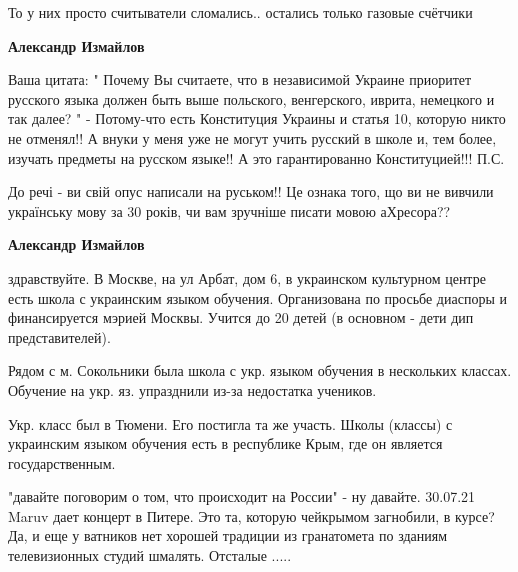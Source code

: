\begin{itemize}
\begin{itemize}
То у них просто считыватели сломались.. остались только газовые счётчики

 
\textbf{Александр Измайлов} 

Ваша цитата: " Почему Вы считаете, что в независимой Украине приоритет
русского языка должен быть выше польского, венгерского, иврита, немецкого и
так далее? " - Потому-что есть Конституция Украины и статья 10, которую никто
не отменял!! А внуки у меня уже не могут учить русский в школе и, тем более,
изучать предметы на русском языке!! А это гарантированно Конституцией!!! П.С.

До речі - ви свій опус написали на руськом!! Це ознака того, що ви не вивчили
українську мову за 30 років, чи вам зручніше писати мовою аХресора??


 
\textbf{Александр Измайлов} 

здравствуйте. В Москве, на ул Арбат, дом 6, в украинском культурном центре есть
школа с украинским языком обучения. Организована по просьбе диаспоры и
финансируется мэрией Москвы. Учится до 20 детей (в основном - дети дип
представителей). 

Рядом с м. Сокольники была школа с укр. языком обучения в нескольких классах.
Обучение на укр. яз. упразднили из-за недостатка учеников.

Укр. класс был в Тюмени. Его постигла та же участь. Школы (классы) с украинским
языком обучения есть в республике Крым, где он является государственным.

 

"давайте поговорим о том, что происходит на России" - ну давайте. 30.07.21
Maruv дает концерт в Питере. Это та, которую чейкрымом загнобили, в курсе? Да,
и еще у ватников нет хорошей традиции из гранатомета по зданиям телевизионных
студий шмалять. Отсталые .....



\end{itemize}
\end{itemize}
